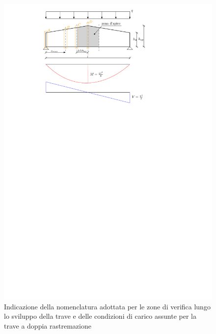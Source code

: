 \begin{pysub}[TraveDoppiaRastremazione]
\begin{figure}[H]
    \centering
    \includegraphics[]{IMG/TraveDoppiaRastremazione.pdf}
    \caption{Indicazione della nomenclatura adottata per le zone di verifica lungo lo sviluppo della trave e delle condizioni di carico assunte per la trave a doppia rastremazione}
    \label{fig:TraveDoppiaRastremazione}
\end{figure}


\end{pysub}
